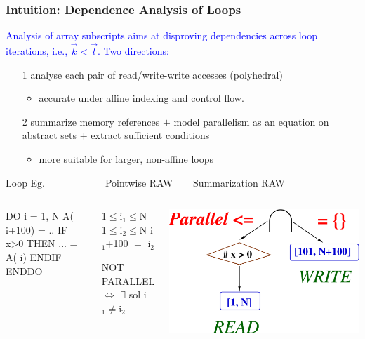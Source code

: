 \documentclass{beamer}
\newcommand{\blue}[1]{\textcolor{Blue}{{#1}}}
\renewcommand{\emph}[1]{\textcolor{structure}{#1}}
\newcommand{\emp}[1]{\textcolor{DikuRed}{ #1}}
\newcommand{\mymath}[1]{$ #1 $}
\newcommand{\myindx}[1]{_{#1}}
\begin{document}
\begin{frame}[fragile,t]
  \frametitle{Intuition: Dependence Analysis of Loops}

\blue{Analysis of array subscripts aims at disproving dependencies across loop iterations, 
i.e., $\vec{k} < \vec{l}$. Two directions:}\medskip
\begin{itemize}
    \item[1] analyse each pair of read/write-write accesses (polyhedral)
        \begin{itemize}
               \item accurate under affine indexing and control flow.\medskip
        \end{itemize}

    \item[2] summarize memory references $+$ model parallelism as an equation 
                on abstract sets $+$ extract sufficient conditions 
            \begin{itemize}
               \item more suitable for larger, non-affine loops \medskip
            \end{itemize}
\end{itemize}

\begin{block}{ Loop Eg.{\tt~~~~~~~~~~~~}Pointwise RAW{\tt~~~~}Summarization RAW} \vspace{-1ex}
\begin{columns}
\begin{colorcode}[fontsize=\scriptsize]
DO \emph{i = 1, N}
  A(\emp{i+100}) = ..
  IF x>0 THEN
    ... = A(\emp{i})
  ENDIF
ENDDO
\end{colorcode}
\begin{colorcode}[fontsize=\scriptsize]
\emph{1\mymath{\leq}i\mymath{\myindx{1}\leq}N}
\emph{1\mymath{\leq}i\mymath{\myindx{2}\leq}N}
\emp{i\mymath{\myindx{1}}+100 \mymath{=} i\mymath{\myindx{2}}}

NOT PARALLEL 
\mymath{\Leftrightarrow} \mymath{\exists} sol i\mymath{\myindx{1}\neq}i\mymath{\myindx{2}}
\end{colorcode}
%
\begin{center} \hspace{-4ex}
\includegraphics[height=13ex]{Figures/SimpleInd}
\end{center}
\end{columns}
\end{block}
 



\end{frame}
\end{document}
